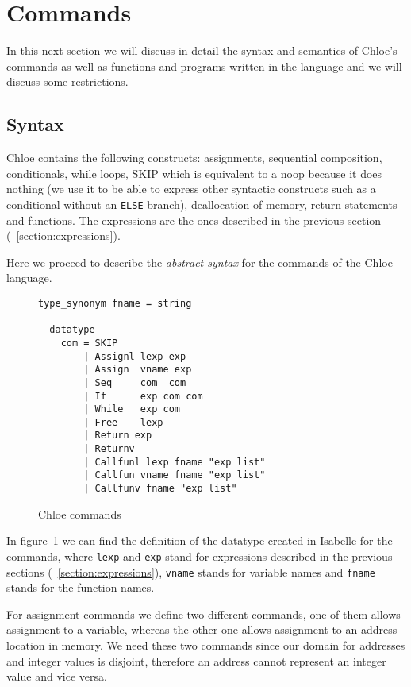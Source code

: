 \section{Commands}\label{section:commands}

In this next section we will discuss in detail the syntax and semantics of Chloe's commands as well as functions and programs written in the language and we will discuss some restrictions.

\subsection{Syntax}\label{subsection:syntax_commands}

Chloe contains the following constructs: assignments, sequential composition, conditionals, while loops, SKIP which is equivalent to a noop because it does nothing (we use it to be able to express other syntactic constructs such as a conditional without an \verb|ELSE| branch), deallocation of memory, return statements and functions.
The expressions are the ones described in the previous section (~\ref{section:expressions}).

Here we proceed to describe the \textit{abstract syntax} for the commands of the Chloe language.

\begin{figure}
  \begin{lstlisting}[frame=single, mathescape=true]
  type_synonym fname = string

  datatype
    com = SKIP
        | Assignl lexp exp
        | Assign  vname exp
        | Seq     com  com
        | If      exp com com
        | While   exp com
        | Free    lexp
        | Return exp
        | Returnv
        | Callfunl lexp fname "exp list"
        | Callfun vname fname "exp list"
        | Callfunv fname "exp list"
  \end{lstlisting}

  \caption{Chloe commands}
  \label{fig:chloe_commands}
\end{figure}

In figure~\ref{fig:chloe_commands} we can find the definition of the datatype created in Isabelle for the commands, where \verb|lexp| and \verb|exp| stand for expressions described in the previous sections (~\ref{section:expressions}), \verb|vname| stands for variable names and \verb|fname| stands for the function names.

For assignment commands we define two different commands, one of them allows assignment to a variable, whereas the other one allows assignment to an address location in memory.
We need these two commands since our domain for addresses and integer values is disjoint, therefore an address cannot represent an integer value and vice versa.

